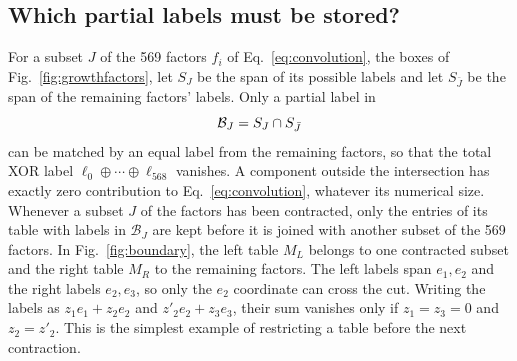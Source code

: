 \subsection{Which partial labels must be stored?}\label{app:E-boundary}
For a subset $J$ of the 569 factors $f_i$ of Eq.~\eqref{eq:convolution}, the boxes of Fig.~\ref{fig:growthfactors}, let $S_J$ be the span of its possible labels and let $S_{\bar J}$ be the span of the remaining factors' labels.
Only a partial label in
\begin{equation}
 {\cal B}_J=S_J\cap S_{\bar J}
 \label{eq:boundary}
\end{equation}
can be matched by an equal label from the remaining factors, so that the total XOR label $\ell_0\oplus\cdots\oplus\ell_{568}$ vanishes. 
A component outside the intersection has exactly zero contribution to Eq.~\eqref{eq:convolution}, whatever its numerical size. 
Whenever a subset $J$ of the factors has been contracted, only the entries of its table with labels in $\mathcal B_J$ are kept before it is joined with another subset of the 569 factors.
In Fig.~\ref{fig:boundary}, the left table $M_L$ belongs to one contracted subset and the right table $M_R$ to the remaining factors. The left labels span $e_1,e_2$ and the right labels $e_2,e_3$, so only the $e_2$ coordinate can cross the cut.
Writing the labels as $z_1e_1+z_2e_2$ and $z'_2e_2+z_3e_3$, their sum vanishes only if $z_1=z_3=0$ and $z_2=z'_2$. 
This is the simplest example of restricting a table before the next contraction.
{\color{black}
}


